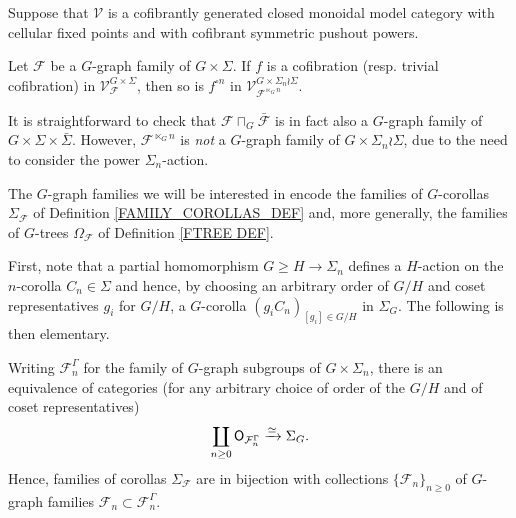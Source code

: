 \documentclass[a4paper,10pt]{article}%
\begin{document}
\begin{proposition}\label{POWERFG PROP}
        Suppose that $\mathcal{V}$ is a cofibrantly generated closed monoidal model category with cellular fixed points and with cofibrant symmetric pushout powers.
	
	Let $\mathcal{F}$ be a $G$-graph family of $G \times \Sigma$. If $f$ is a cofibration (resp. trivial cofibration) in
	$\mathcal{V}^{G \times \Sigma}_{\mathcal{F}}$,
	then so is $f^{\square n}$
        in 
	$\mathcal{V}^{G \times \Sigma_n \wr \Sigma}_{\mathcal{F}^{\ltimes_{G} n}}$.
\end{proposition}


\begin{remark}
        It is straightforward to check that 
        $\mathcal{F} \sqcap_G \bar{\mathcal{F}}$
	is in fact also a $G$-graph family of $G \times \Sigma \times \bar{\Sigma}$.
	However, $\mathcal{F}^{\ltimes_G n}$ is \textit{not}
	a $G$-graph family of $G \times \Sigma_n \wr \Sigma$,
	due to the need to consider the power $\Sigma_n$-action.
\end{remark}

The $G$-graph families we will be interested in
encode the families of $G$-corollas 
 $\Sigma_{\mathcal{F}}$
of Definition \ref{FAMILY_COROLLAS_DEF} and,
more generally, the families of $G$-trees 
$\Omega_{\mathcal{F}}$ 
of Definition \ref{FTREE DEF}. 

First, note that a partial homomorphism
$G \geq H \to \Sigma_n$
defines a $H$-action on the $n$-corolla $C_n \in \Sigma$
and hence, by choosing an arbitrary order of 
$G/H$ and coset representatives $g_i$ for $G/H$, a $G$-corolla
$(g_i C_n)_{[g_i] \in G/H}$ in $\Sigma_G$. The following is then elementary.


\begin{lemma}\label{FAMILY_COROLLAS_LEM}
Writing $\mathcal{F}_{n}^{\Gamma}$ for the family  of $G$-graph subgroups
of $G \times \Sigma_n$,
there is an equivalence of categories
(for any arbitrary choice of order of the $G/H$ and of coset representatives)
\[\coprod_{n \geq 0} \mathsf{O}_{\mathcal F_n^{\Gamma}} \xrightarrow{\simeq} \Sigma_G.\] 
Hence, families of corollas $\Sigma_{\mathcal{F}}$
are in bijection with collections
$\{\mathcal{F}_n\}_{n\geq 0}$
of $G$-graph families 
$\mathcal{F}_n \subset \mathcal{F}_{n}^{\Gamma}$.
\end{lemma}
\end{document}
